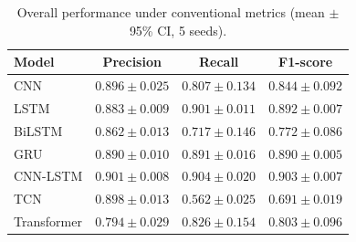 \begin{table}[!t]
\caption{Overall performance under conventional metrics (mean $\pm$ 95\% CI, 5 seeds).}
\label{tab:overall-conv}
\centering
\begin{tabular}{lccc}
\hline
\textbf{Model} & \textbf{Precision} & \textbf{Recall} & \textbf{F1-score} \\
\hline
CNN & $0.896 \pm 0.025$ & $0.807 \pm 0.134$ & $0.844 \pm 0.092$ \\
LSTM & $0.883 \pm 0.009$ & $0.901 \pm 0.011$ & $0.892 \pm 0.007$ \\
BiLSTM & $0.862 \pm 0.013$ & $0.717 \pm 0.146$ & $0.772 \pm 0.086$ \\
GRU & $0.890 \pm 0.010$ & $0.891 \pm 0.016$ & $0.890 \pm 0.005$ \\
CNN-LSTM & $0.901 \pm 0.008$ & $0.904 \pm 0.020$ & $0.903 \pm 0.007$ \\
TCN & $0.898 \pm 0.013$ & $0.562 \pm 0.025$ & $0.691 \pm 0.019$ \\
Transformer & $0.794 \pm 0.029$ & $0.826 \pm 0.154$ & $0.803 \pm 0.096$ \\
\hline
\end{tabular}
\end{table}